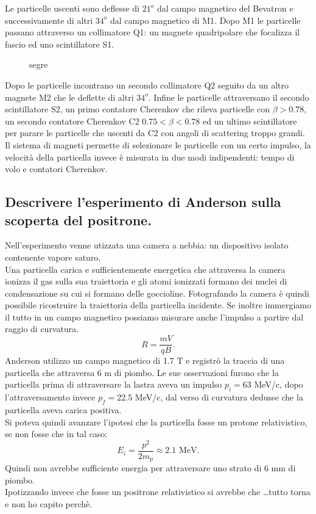 Le particelle uscenti sono deflesse di $21^o$ dal campo magnetico del Bevatron e successivamente di altri $34^o$ dal campo magnetico di M1. Dopo M1 le particelle passano attraverso un collimatore Q1: un magnete quadripolare che focalizza il fascio ed uno scintillatore S1. 
\begin{figure}[H]
    \centering
    \caption{segre}
    \label{fig:segre}
\end{figure}
Dopo le particelle incontrano un secondo collimatore Q2 seguito da un altro magnete M2 che le deflette di altri $34^o$. Infine le particelle attraversano il secondo scintillatore S2, un primo contatore Cherenkov che rileva particelle con $\beta>0.78$, un secondo contatore Cherenkov C2 $0.75< \beta<0.78$ ed un ultimo scintillatore per parare le particelle che uscenti da C2 con angoli di scattering troppo grandi.
Il sistema di magneti permette di selezionare le particelle con un certo impulso, la velocità della particella invece è misurata in due modi indipendenti: tempo di volo e contatori Cherenkov.

\subsection[]{Descrivere l’esperimento di Anderson sulla scoperta del positrone.
}\label{sec:4.a.34}
Nell'esperimento venne utizzata una camera a nebbia: un dispositivo isolato contenente vapore saturo. \\ 
Una particella carica e sufficientemente energetica che attraversa la camera ionizza il gas sulla sua traiettoria e gli atomi ionizzati formano dei nuclei di condensazione su cui si formano delle goccioline. Fotografando la camera è quindi possibile ricostruire la traiettoria della particella incidente. Se inoltre immergiamo il tutto in un campo magnetico possiamo misurare anche l'impulso a partire dal raggio di curvatura.
\[
	R = \frac{mV}{qB}
.\] 
Anderson utilizzo un campo magnetico di 1.7 T e registrò la traccia di una particella che attraversa 6 m di piombo. Le sue osservazioni furono che la particella prima di attraversare la lastra aveva un impulso $p_{i}=63$ MeV/c, dopo l'attraversamento invece $p_{f}=22.5$ MeV/c, dal verso di curvatura dedusse che la particella aveva carica positiva.\\
Si poteva quindi avanzare l'ipotesi che la particella fosse un protone relativistico, se non fosse che in tal caso:
\[
	E_{i}= \frac{p^2}{2m_{p}}\approx 2.1 \text{ MeV}
.\] 
Quindi non avrebbe sufficiente energia per attraversare uno strato di 6 mm di piombo.\\
Ipotizzando invece che fosse un positrone relativistico si avrebbe che \ldots tutto torna e non ho capito perchè.

